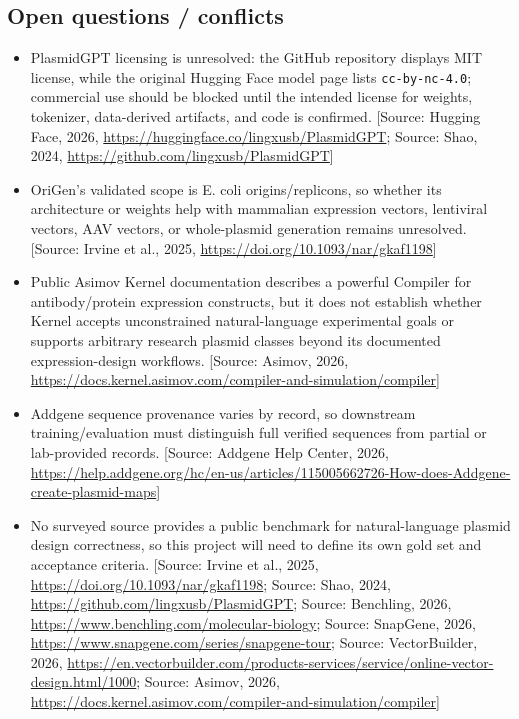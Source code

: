 \documentclass[11pt]{report}
\begin{document}
\subsection{Open questions / conflicts}
\begin{itemize}
\item PlasmidGPT licensing is unresolved: the GitHub repository displays MIT license, while the original Hugging Face model page lists \texttt{cc-by-nc-4.0}; commercial use should be blocked until the intended license for weights, tokenizer, data-derived artifacts, and code is confirmed. [Source: Hugging Face, 2026, \url{https://huggingface.co/lingxusb/PlasmidGPT}; Source: Shao, 2024, \url{https://github.com/lingxusb/PlasmidGPT}]
\item OriGen's validated scope is E. coli origins/replicons, so whether its architecture or weights help with mammalian expression vectors, lentiviral vectors, AAV vectors, or whole-plasmid generation remains unresolved. [Source: Irvine et al., 2025, \url{https://doi.org/10.1093/nar/gkaf1198}]
\item Public Asimov Kernel documentation describes a powerful Compiler for antibody/protein expression constructs, but it does not establish whether Kernel accepts unconstrained natural-language experimental goals or supports arbitrary research plasmid classes beyond its documented expression-design workflows. [Source: Asimov, 2026, \url{https://docs.kernel.asimov.com/compiler-and-simulation/compiler}]
\item Addgene sequence provenance varies by record, so downstream training/evaluation must distinguish full verified sequences from partial or lab-provided records. [Source: Addgene Help Center, 2026, \url{https://help.addgene.org/hc/en-us/articles/115005662726-How-does-Addgene-create-plasmid-maps}]
\item No surveyed source provides a public benchmark for natural-language plasmid design correctness, so this project will need to define its own gold set and acceptance criteria. [Source: Irvine et al., 2025, \url{https://doi.org/10.1093/nar/gkaf1198}; Source: Shao, 2024, \url{https://github.com/lingxusb/PlasmidGPT}; Source: Benchling, 2026, \url{https://www.benchling.com/molecular-biology}; Source: SnapGene, 2026, \url{https://www.snapgene.com/series/snapgene-tour}; Source: VectorBuilder, 2026, \url{https://en.vectorbuilder.com/products-services/service/online-vector-design.html/1000}; Source: Asimov, 2026, \url{https://docs.kernel.asimov.com/compiler-and-simulation/compiler}]
\end{itemize}
\end{document}
